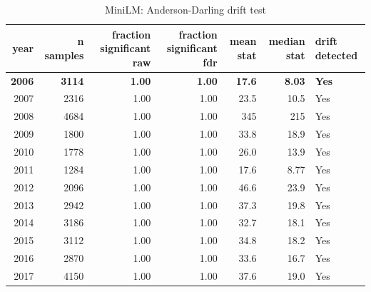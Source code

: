 \begin{table}[ht]
\centering
\caption{MiniLM: Anderson-Darling drift test}
\label{tab:minilm_ad}
\begin{tabular}{rrrrrrl}
\toprule
year & n samples & fraction significant raw & fraction significant fdr & mean stat & median stat & drift detected \\
\midrule
\textbf{2006} & \textbf{3114} & \textbf{1.00} & \textbf{1.00} & \textbf{17.6} & \textbf{8.03} & \textbf{Yes} \\
2007 & 2316 & 1.00 & 1.00 & 23.5 & 10.5 & Yes \\
2008 & 4684 & 1.00 & 1.00 & 345 & 215 & Yes \\
2009 & 1800 & 1.00 & 1.00 & 33.8 & 18.9 & Yes \\
2010 & 1778 & 1.00 & 1.00 & 26.0 & 13.9 & Yes \\
2011 & 1284 & 1.00 & 1.00 & 17.6 & 8.77 & Yes \\
2012 & 2096 & 1.00 & 1.00 & 46.6 & 23.9 & Yes \\
2013 & 2942 & 1.00 & 1.00 & 37.3 & 19.8 & Yes \\
2014 & 3186 & 1.00 & 1.00 & 32.7 & 18.1 & Yes \\
2015 & 3112 & 1.00 & 1.00 & 34.8 & 18.2 & Yes \\
2016 & 2870 & 1.00 & 1.00 & 33.6 & 16.7 & Yes \\
2017 & 4150 & 1.00 & 1.00 & 37.6 & 19.0 & Yes \\
\bottomrule
\end{tabular}
\end{table}
